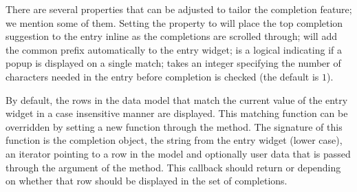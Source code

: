 There are several properties that can be adjusted to tailor the
completion feature; we mention some of them. Setting the property
 to  will place the top completion
suggestion to the entry inline as the completions are scrolled
through;  will add the common prefix
automatically to the entry widget;  is a
logical indicating if a popup is displayed on a single match;
 takes an integer specifying the number of
characters needed in the entry before completion is checked (the
default is $1$).

By default, the rows in the data model that match the current value of
the entry widget in a case insensitive manner are displayed. This
matching function can be overridden by setting a new \R\/ function through
the  method. The signature of
this function is the completion object, the string from the entry
widget (lower case), an iterator pointing to a row in the model and
optionally user data that is passed through the 
argument of the  method. This callback should
return  or  depending on whether that row
should be displayed in the set of completions.

